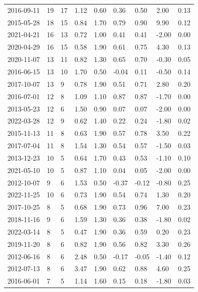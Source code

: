 \begin{table}[]
\begin{tabular}{lll|ll|ll|ll}
2016-09-11 & 19 & 17 & 1.12 & 0.60 & 0.36 & 0.50 & 2.00 & 0.13 \\
2015-05-28 & 18 & 15 & 0.84 & 1.70 & 0.79 & 0.90 & 9.90 & 0.12 \\
2021-04-21 & 16 & 13 & 0.72 & 1.00 & 0.41 & 0.41 & -2.00 & 0.00 \\
2020-04-29 & 16 & 15 & 0.58 & 1.90 & 0.61 & 0.75 & 4.30 & 0.13 \\
2020-11-07 & 13 & 11 & 0.82 & 1.30 & 0.65 & 0.70 & -0.30 & 0.05 \\
2016-06-15 & 13 & 10 & 1.70 & 0.50 & -0.04 & 0.11 & -0.50 & 0.14 \\
2017-10-07 & 13 & 9 & 0.78 & 1.90 & 0.51 & 0.71 & 2.80 & 0.20 \\
2016-07-01 & 12 & 8 & 1.09 & 1.10 & 0.87 & 0.87 & -1.70 & 0.00 \\
2013-05-23 & 12 & 6 & 1.50 & 0.90 & 0.07 & 0.07 & -2.00 & 0.00 \\
2022-03-28 & 12 & 9 & 0.62 & 1.40 & 0.22 & 0.24 & -1.80 & 0.02 \\
2015-11-13 & 11 & 8 & 0.63 & 1.90 & 0.57 & 0.78 & 3.50 & 0.22 \\
2017-07-04 & 11 & 8 & 1.54 & 1.30 & 0.54 & 0.57 & -1.50 & 0.03 \\
2013-12-23 & 10 & 5 & 0.64 & 1.70 & 0.43 & 0.53 & -1.10 & 0.10 \\
2021-05-10 & 10 & 5 & 0.87 & 1.10 & 0.04 & 0.05 & -2.00 & 0.00 \\
2012-10-07 & 9 & 6 & 1.53 & 0.50 & -0.37 & -0.12 & -0.80 & 0.25 \\
2022-11-25 & 10 & 6 & 0.73 & 1.90 & 0.54 & 0.74 & 1.30 & 0.20 \\
2017-10-25 & 8 & 5 & 0.68 & 1.90 & 0.73 & 0.96 & 7.00 & 0.23 \\
2018-11-16 & 9 & 6 & 1.59 & 1.30 & 0.36 & 0.38 & -1.80 & 0.02 \\
2022-03-14 & 8 & 5 & 0.47 & 1.90 & 0.36 & 0.59 & 0.20 & 0.23 \\
2019-11-20 & 8 & 6 & 0.82 & 1.90 & 0.56 & 0.82 & 3.30 & 0.26 \\
2012-06-16 & 8 & 6 & 2.48 & 0.50 & -0.17 & -0.05 & -1.40 & 0.12 \\
2012-07-13 & 8 & 6 & 3.47 & 1.90 & 0.62 & 0.88 & 4.60 & 0.25 \\
2016-06-01 & 7 & 5 & 1.14 & 1.60 & 0.15 & 0.18 & -1.80 & 0.03 \\
\hline
\end{tabular}
    \label{tab:closures}
\end{table}
